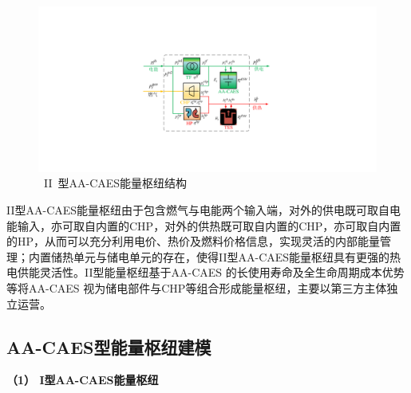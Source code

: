 \begin{figure}[H] %
  \centering
  \includegraphics[scale=0.45]{figures/Chap4-2-AA-CAES-Hub-V3.pdf}
  \caption{~II~型AA-CAES能量枢纽结构}
  \label{fig:AA-CAES-Hub-V2}
\end{figure}

II型AA-CAES能量枢纽由于包含燃气与电能两个输入端，对外的供电既可取自电能输入，亦可取自内置的CHP，对外的供热既可取自内置的CHP，亦可取自内置的HP，从而可以充分利用电价、热价及燃料价格信息，实现灵活的内部能量管理；内置储热单元与储电单元的存在，使得II型AA-CAES能量枢纽具有更强的热电供能灵活性。II型能量枢纽基于AA-CAES 的长使用寿命及全生命周期成本优势等将AA-CAES 视为储电部件与CHP等组合形成能量枢纽，主要以第三方主体独立运营。

\subsection{AA-CAES型能量枢纽建模}
\label{sec:thermo-EH-CAES}

\textbf{（1） I型AA-CAES能量枢纽}

